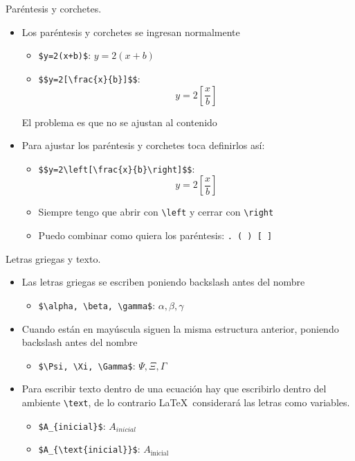 \documentclass[dvipsnames,xcolor, handout]{beamer}
\theoremstyle{plain}
\theoremstyle{definition}
\begin{document}
\begin{frame}[fragile]{Paréntesis y corchetes.}
\begin{itemize}
    \item Los paréntesis y corchetes se ingresan normalmente
    \begin{itemize}
        \item \verb!$y=2(x+b)$!: $y=2(x+b)$
        \item \verb!$$y=2[\frac{x}{b}]$$!: $$y=2[\frac{x}{b}]$$
    \end{itemize}\pause
    El problema es que no se ajustan al contenido\pause
    \item Para ajustar los paréntesis y corchetes toca definirlos así:
    \begin{itemize}
        \item \verb!$$y=2\left[\frac{x}{b}\right]$$!: $$y=2\left[\frac{x}{b}\right]$$
    \item Siempre tengo que abrir con \verb!\left! y cerrar con \verb!\right!
    \item Puedo combinar como quiera los paréntesis: \verb!. ( ) [ ]!
    \end{itemize}
\end{itemize}
\end{frame}

\begin{frame}[fragile]{Letras griegas y texto.}
\begin{itemize}
    \item Las letras griegas se escriben poniendo backslash antes del nombre
    \begin{itemize}
        \item \verb!$\alpha, \beta, \gamma$!: $\alpha, \beta, \gamma$
    \end{itemize}\pause
    \item Cuando están en mayúscula siguen la misma estructura anterior, poniendo backslash antes del nombre
    \begin{itemize}
        \item \verb!$\Psi, \Xi, \Gamma$!: $\Psi, \Xi, \Gamma$
    \end{itemize}\pause
    
    \item Para escribir texto dentro de una ecuación hay que escribirlo dentro del ambiente \verb!\text!, de lo contrario \LaTeX\ considerará las letras como variables.
    \begin{itemize}
        \item \verb!$A_{inicial}$!: $A_{inicial}$
        \item \verb!$A_{\text{inicial}}$!: $A_{\text{inicial}}$
    \end{itemize}
\end{itemize}
\end{frame}
\end{document}

